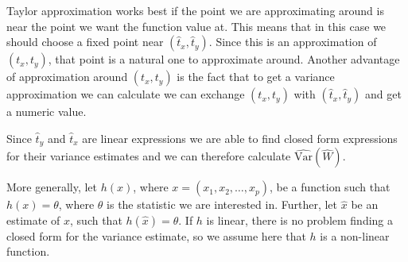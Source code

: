 \documentclass{article}
\begin{document}
\begin{example}
    Taylor approximation works best if the point we are approximating around is
    near the point we want the function value at. This means that in this case we should
    choose a fixed point near \((\hat{t}_x, \hat{t}_y)\). Since this is an approximation
    of \((t_x, t_y)\), that point is a natural one to approximate around. Another
    advantage of approximation around \((t_x, t_y)\) is the fact that to get a
    variance approximation we can calculate we can exchange \((t_x,
    t_y)\) with \((\hat{t}_x, \hat{t}_y)\) and get a numeric value.

    Since \(\hat{t}_y\) and \(\hat{t}_x\) are linear expressions we are able to
    find closed form expressions for their variance estimates and we can
    therefore calculate \(\widehat{\mathrm{Var}} \left( \widehat{W} \right)\).

\end{example}

More generally, let \(h(x)\), where \(x = (x_1, x_2, \dots, x_p)\), be a function such that \(h(x) = \theta\), where
\(\theta\) is the statistic we are interested in. Further, let \(\hat{x}\) be an
estimate of \(x\), such that \(h(\hat{x}) = \hat{\theta}\). If \(h\) is
linear, there is no problem finding a closed form for the variance estimate,
so we assume here that \(h\) is a non-linear function.
\end{document}
